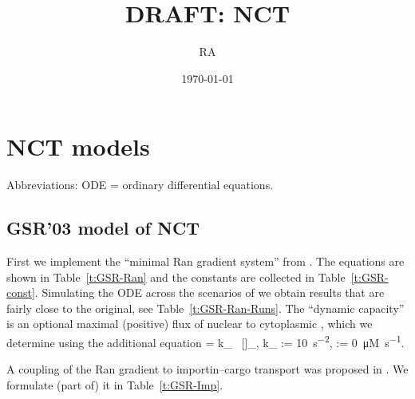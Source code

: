 \documentclass[12pt,notitlepage]{article}
\title{DRAFT: NCT}
\author{RA}
\date{\today}
\renewcommand{\d}{\mathrm{d}}
\newcommand{\ddt}{\frac{\d}{\d{t}}}
\newcommand{\TEXT}[1]{\quad\text{#1}\quad}
\def\[#1\]{\begin{align}#1\end{align}}
\begin{document}
\maketitle

\section{NCT models}

Abbreviations:
ODE = ordinary differential equations.

\subsection{GSR'03 model of NCT}

First we implement
the ``minimal Ran gradient system'' from 
\cite{GoerlichSeewaldRibbeck2003}.
%
%
The equations are shown in
Table~\ref{t:GSR-Ran}
and
the constants are collected in 
Table~\ref{t:GSR-const}.
%
%
Simulating the ODE
across the scenarios of 
\cite{GoerlichSeewaldRibbeck2003}
we obtain 
results that are fairly close
to the original,
see Table~\ref{t:GSR-Ran-Runs}.
%
%
The ``dynamic capacity'' 
is an optional maximal (positive) flux
of nuclear  to cytoplasmic ,
which we determine using the additional equation
\[
	\label{e:Ex}
	\ddt {}
	=
	k_{} \, []_,
	\quad
	k_{} := \SI{10}{s^{-2}},
	\TEXT{initial}
	 := \SI{0}{\micro M . s^{-1}}.
\]

%

A coupling of the Ran gradient
to 
importin--cargo transport
was proposed in 
\cite[Fig.~6A]{GoerlichSeewaldRibbeck2003}.
%
We formulate (part of) it in 
Table~\ref{t:GSR-Imp}.
\end{document}
